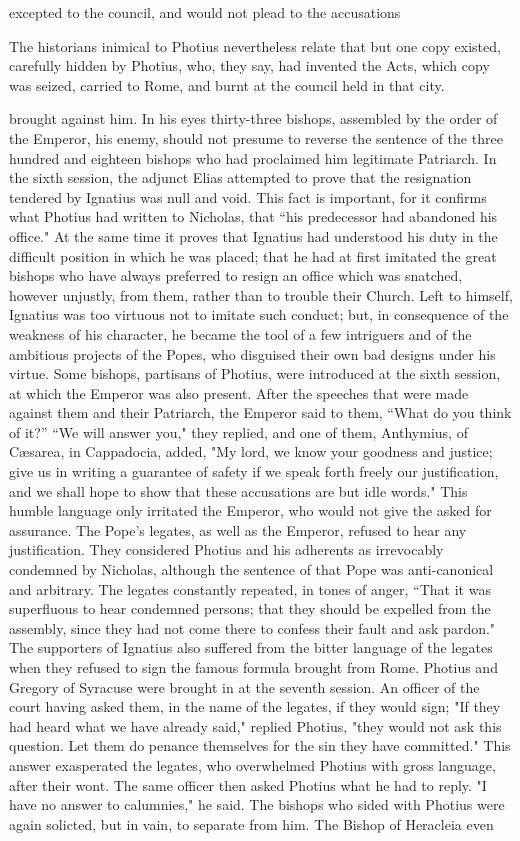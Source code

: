 excepted to the council, and would not plead to the accusations

The historians inimical to Photius nevertheless relate that but one copy existed, carefully hidden by Photius, who, they say, had invented the Acts, which copy was seized, carried to Rome, and burnt at the council held in that city.

brought against him. In his eyes thirty-three bishops, assembled by the order of the Emperor, his enemy, should not presume to reverse the sentence of the three hundred and eighteen bishops who had proclaimed him legitimate Patriarch. In the sixth session, the adjunct Elias attempted to prove that the resignation tendered by Ignatius was null and void. This fact is important, for it confirms what Photius had written to Nicholas, that “his predecessor had abandoned his office." At the same time it proves that Ignatius had understood his duty in the difficult position in which he was placed; that he had at first imitated the great bishops who have always preferred to resign an office which was snatched, however unjustly, from them, rather than to trouble their Church. Left to himself, Ignatius was too virtuous not to imitate such conduct; but, in consequence of the weakness of his character, he became the tool of a few intriguers and of the ambitious projects of the Popes, who disguised their own bad designs under his virtue. Some bishops, partisans of Photius, were introduced at the sixth session, at which the Emperor was also present. After the speeches that were made against them and their Patriarch, the Emperor said to them, “What do you think of it?” “We will answer you," they replied, and one of them, Anthymius, of Cæsarea, in Cappadocia, added, "My lord, we know your goodness and justice; give us in writing a guarantee of safety if we speak forth freely our justification, and we shall hope to show that these accusations are but idle words." This humble language only irritated the Emperor, who would not give the asked for assurance. The Pope's legates, as well as the Emperor, refused to hear any justification. They considered Photius and his adherents as irrevocably condemned by Nicholas, although the sentence of that Pope was anti-canonical and arbitrary. The legates constantly repeated, in tones of anger, “That it was superfluous to hear condemned persons; that they should be expelled from the assembly, since they had not come there to confess their fault and ask pardon." The supporters of Ignatius also suffered from the bitter language of the legates when they refused to sign the famous formula brought from Rome. Photius and Gregory of Syracuse were brought in at the seventh session. An officer of the court having asked them, in the name of the legates, if they would sign; "If they had heard what we have already said," replied Photius, "they would not ask this question. Let them do penance themselves for the sin they have committed." This answer exasperated the legates, who overwhelmed Photius with gross language, after their wont. The same officer then asked Photius what he had to reply. "I have no answer to calumnies," he said. The bishops who sided with Photius were again solicted, but in vain, to separate from him. The Bishop of Heracleia even 